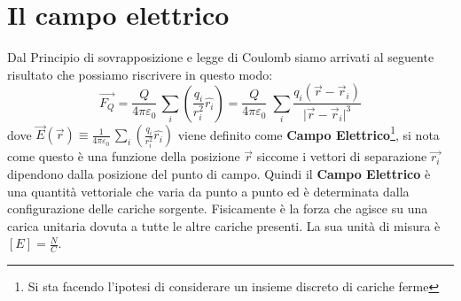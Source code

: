 \documentclass{book}
\begin{document}
\section{Il campo elettrico}
Dal Principio di sovrapposizione e legge di Coulomb siamo arrivati al seguente risultato che possiamo riscrivere in questo modo:
\[
\vec{F_Q}= \frac{Q}{4\pi\varepsilon_0}\,  \sum_i ( \frac{ q_i }{r_{i}^{2}}\hat{r_i}) = \frac{Q}{4\pi\varepsilon_0}\;
\sum_i \frac{q_i (\vec{r} - \vec{r}_i )}{ \lvert{\vec{r} - \vec{r}_i } \rvert ^3} 
\]
dove $\vec{E}(\vec{r}) \equiv \frac{1}{4\pi\varepsilon_0}\,  \sum_i ( \frac{ q_i }{r_{i}^{2}}\hat{r_i})$  viene definito come \textbf{Campo Elettrico}\footnote{Si sta facendo l'ipotesi di considerare un insieme discreto di cariche ferme }, si nota come questo è una funzione della posizione $\vec{r}$ siccome i vettori di separazione $\vec{r_i}$ dipendono dalla posizione del punto di campo.
Quindi il \textbf{Campo Elettrico} è una quantità vettoriale che varia da punto a punto ed è determinata dalla configurazione delle cariche sorgente.
Fisicamente è la forza che agisce su una carica unitaria dovuta a tutte le altre cariche presenti.
La sua unità di misura è $[E]=\frac{N}{C}$.
\end{document}
